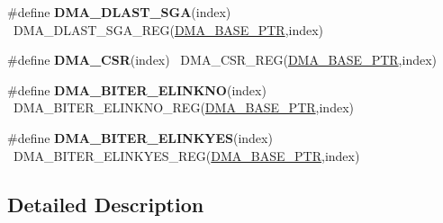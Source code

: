 \begin{DoxyCompactItemize}
\item 
\hypertarget{group___d_m_a___register___accessor___macros_ga30a5fc629c2643db8e3748c2832d7b4d}{}\#define {\bfseries D\+M\+A\+\_\+\+D\+L\+A\+S\+T\+\_\+\+S\+G\+A}(index)                                      ~D\+M\+A\+\_\+\+D\+L\+A\+S\+T\+\_\+\+S\+G\+A\+\_\+\+R\+E\+G(\hyperlink{group___d_m_a___peripheral_ga6997fbc1b1973e9f27170217a3bd6f22}{D\+M\+A\+\_\+\+B\+A\+S\+E\+\_\+\+P\+T\+R},index)\label{group___d_m_a___register___accessor___macros_ga30a5fc629c2643db8e3748c2832d7b4d}

\item 
\hypertarget{group___d_m_a___register___accessor___macros_ga393d0ab30885aa78471aeb5eafc9cfc9}{}\#define {\bfseries D\+M\+A\+\_\+\+C\+S\+R}(index)                                                  ~D\+M\+A\+\_\+\+C\+S\+R\+\_\+\+R\+E\+G(\hyperlink{group___d_m_a___peripheral_ga6997fbc1b1973e9f27170217a3bd6f22}{D\+M\+A\+\_\+\+B\+A\+S\+E\+\_\+\+P\+T\+R},index)\label{group___d_m_a___register___accessor___macros_ga393d0ab30885aa78471aeb5eafc9cfc9}

\item 
\hypertarget{group___d_m_a___register___accessor___macros_gafd92014dcd689b05f10de07148f59a45}{}\#define {\bfseries D\+M\+A\+\_\+\+B\+I\+T\+E\+R\+\_\+\+E\+L\+I\+N\+K\+N\+O}(index)                              ~D\+M\+A\+\_\+\+B\+I\+T\+E\+R\+\_\+\+E\+L\+I\+N\+K\+N\+O\+\_\+\+R\+E\+G(\hyperlink{group___d_m_a___peripheral_ga6997fbc1b1973e9f27170217a3bd6f22}{D\+M\+A\+\_\+\+B\+A\+S\+E\+\_\+\+P\+T\+R},index)\label{group___d_m_a___register___accessor___macros_gafd92014dcd689b05f10de07148f59a45}

\item 
\hypertarget{group___d_m_a___register___accessor___macros_gacaa6fdc8477b7277d24e90a2a3df0de8}{}\#define {\bfseries D\+M\+A\+\_\+\+B\+I\+T\+E\+R\+\_\+\+E\+L\+I\+N\+K\+Y\+E\+S}(index)                            ~D\+M\+A\+\_\+\+B\+I\+T\+E\+R\+\_\+\+E\+L\+I\+N\+K\+Y\+E\+S\+\_\+\+R\+E\+G(\hyperlink{group___d_m_a___peripheral_ga6997fbc1b1973e9f27170217a3bd6f22}{D\+M\+A\+\_\+\+B\+A\+S\+E\+\_\+\+P\+T\+R},index)\label{group___d_m_a___register___accessor___macros_gacaa6fdc8477b7277d24e90a2a3df0de8}

\end{DoxyCompactItemize}


\subsection{Detailed Description}
